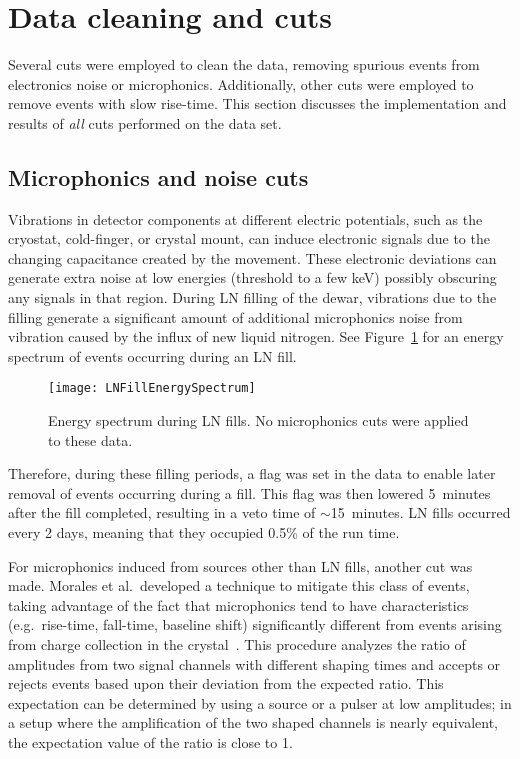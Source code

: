 	\section{Data cleaning and cuts}
	\label{sec:BeGeCuts}	
	
	Several cuts were employed to clean the data, removing spurious events from electronics noise or microphonics.  Additionally, other cuts were employed to remove events with slow rise-time.  This section discusses the implementation and results of \emph{all} cuts performed on the data set.  
	
		\subsection{Microphonics and noise cuts}
	     	\label{sec:MicroCuts}	
	
	Vibrations in detector components at different electric potentials, such as the cryostat, cold-finger, or crystal mount, can induce electronic signals due to the changing capacitance created by the movement.  These electronic deviations can generate extra noise at low energies (threshold to a few keV) possibly obscuring any signals in that region.  During LN filling of the dewar, vibrations due to the filling generate a significant amount of additional microphonics noise from vibration caused by the influx of new liquid nitrogen.  See Figure~\ref{fig:BeGeLNExample} for an energy spectrum of events occurring during an LN fill.  
			\begin{figure}
				\centering
				\texttt{[image: LNFillEnergySpectrum]}
				\caption[Energy spectrum during LN fills]
				{Energy spectrum during LN fills.  No microphonics cuts were applied to these data.}
				\label{fig:BeGeLNExample}
			\end{figure}
Therefore, during these filling periods, a flag was set in the data to enable later removal of events occurring during a fill.  This flag was then lowered 5~minutes after the fill completed, resulting in a veto time of $\sim$15~minutes.  LN fills occurred every 2 days, meaning that they occupied 0.5\% of the run time.  
		
	For microphonics induced from sources other than LN fills, another cut was
made.  Morales et al.~developed a technique to mitigate this class of events,
taking advantage of the fact that microphonics tend to have characteristics
(e.g.~rise-time, fall-time, baseline shift) significantly different from events
arising from charge collection in the crystal~\cite{Morales1992410}.  This
procedure analyzes the ratio of amplitudes from two signal channels with
different shaping times  and accepts or rejects events based upon their
deviation from the expected ratio.  This expectation can be determined by using
a source or a pulser at low amplitudes; in a setup where the amplification of
the two shaped channels is nearly equivalent, the expectation value of the ratio
is close to 1.  
	
